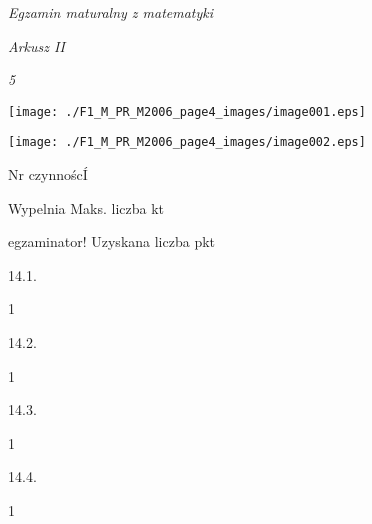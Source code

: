 \documentclass[a4paper,12pt]{article}
\begin{document}
{\it Egzamin maturalny z matematyki}

{\it Arkusz II}

{\it 5}
\begin{center}
\texttt{[image: ./F1\_M\_PR\_M2006\_page4\_images/image001.eps]}

\texttt{[image: ./F1\_M\_PR\_M2006\_page4\_images/image002.eps]}
\end{center}
Nr czynnoścÍ

Wypelnia Maks. liczba kt

egzaminator! Uzyskana liczba pkt

14.1.

1

14.2.

1

14.3.

1

14.4.

1
\end{document}
